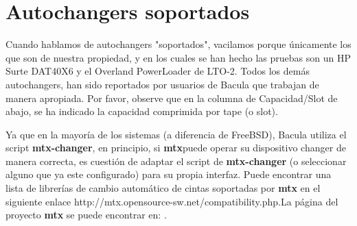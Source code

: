 
\chapter{Autochangers soportados}
\label{Modelos}

Cuando hablamos de autochangers "soportados", vacilamos porque únicamente 
los que son de nuestra propiedad, y en los cuales se han hecho las pruebas
son un HP Surte DAT40X6 y el Overland PowerLoader de LTO-2. Todos los demás autochangers,
han sido reportados por usuarios de Bacula que trabajan de manera apropiada. Por
favor, observe que en la columna de Capacidad/Slot de abajo, se ha indicado la capacidad
comprimida por tape (o slot).

Ya que en la mayoría de los sistemas (a diferencia de FreeBSD), Bacula utiliza el
script {\bf mtx-changer}, en principio, si {\bf mtx}puede operar su dispositivo
changer de manera correcta, es cuestión de adaptar el script de {\bf mtx-changer}
(o seleccionar alguno que ya este configurado) para su propia interfaz. Puede encontrar
una lista de librerías de cambio automático de cintas soportadas por {\bf mtx}
en el siguiente enlace 
{http://mtx.opensource-sw.net/compatibility.php}.La página del proyecto {\bf mtx} 
se puede encontrar en: .

